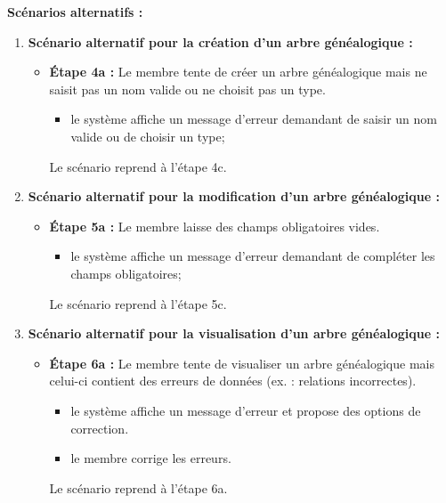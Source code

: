 \textbf{Scénarios alternatifs :}

\begin{enumerate}
    \item \textbf{Scénario alternatif pour la création d'un arbre généalogique :}
    \begin{itemize}
        \item \textbf{Étape 4a :} Le membre tente de créer un arbre
          généalogique mais ne saisit pas un nom valide ou ne choisit pas un type.
        \begin{itemize}
            \item le système affiche un message d'erreur demandant de saisir
              un nom valide ou de choisir un type;
        \end{itemize}
        Le scénario reprend à l'étape 4c.
    \end{itemize}

    \item \textbf{Scénario alternatif pour la modification d'un arbre généalogique :}
    \begin{itemize}
        \item \textbf{Étape 5a :} Le membre laisse des champs obligatoires vides.
        \begin{itemize}
            \item le système affiche un message d'erreur demandant de compléter les champs obligatoires;
        \end{itemize}
        Le scénario reprend à l'étape 5c.
    \end{itemize}

  \item \textbf{Scénario alternatif pour la visualisation d'un arbre généalogique :}
    \begin{itemize}
      \item \textbf{Étape 6a :} Le membre tente de visualiser un arbre
        généalogique mais celui-ci contient des erreurs de données (ex. : relations incorrectes).
        \begin{itemize}
          \item le système affiche un message d'erreur et propose des options de correction.
          \item le membre corrige les erreurs.
        \end{itemize}
        Le scénario reprend à l'étape 6a.
    \end{itemize}


\end{enumerate}
